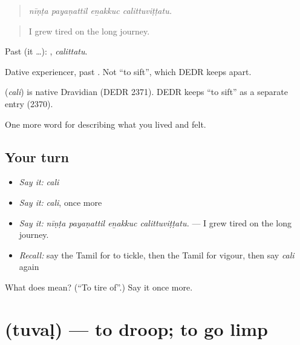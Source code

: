 \begin{quote}
\emph{nīṇṭa payaṇattil eṉakkuc calittuviṭṭatu.}
\end{quote}

\begin{quote}
I grew tired on the long journey.
\end{quote}

Past (it …): , \emph{calittatu}.

Dative experiencer, past . Not  \textquotedblleft{}to sift\textquotedblright{}, which DEDR keeps apart.

\begin{cousinweb}
\textbf{} (\emph{cali}) is native Dravidian (DEDR 2371). DEDR keeps  \textquotedblleft{}to sift\textquotedblright{} as a separate entry (2370).
\end{cousinweb}

\begin{grammarlens}[title={What you've built}]
One more word for describing what you lived and felt.
\end{grammarlens}

\subsection*{Your turn}
\begin{itemize}
\raggedright
  \item \emph{Say it:} \emph{cali}
  \item \emph{Say it:} \emph{cali}, once more
  \item \emph{Say it:} \emph{nīṇṭa payaṇattil eṉakkuc calittuviṭṭatu.} — I grew tired on the long journey.
  \item \emph{Recall:} say the Tamil for to tickle, then the Tamil for vigour, then say \emph{cali} again
\end{itemize}

\begin{tcolorbox}[breakable,colback=teal!4,colframe=teal!35!black,title={Before you move on}]
What does  mean? (\textquotedblleft{}To tire of\textquotedblright{}.) Say it once more.
\end{tcolorbox}
\section[\texorpdfstring{\ta{துவள்} (tuvaḷ)}{துவள் (tuvaḷ)}]{ (tuvaḷ) — to droop; to go limp}

\label{lesson:TA-C468-tuval}



